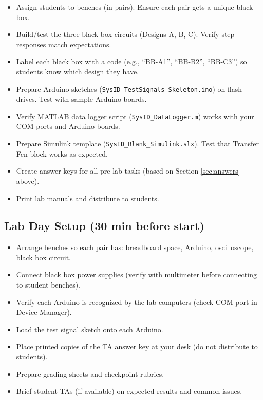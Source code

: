 \documentclass[11pt,letterpaper]{article}
\begin{document}
\begin{itemize}
    \item[$\square$] Assign students to benches (in pairs). Ensure each pair gets a unique black box.
    \item[$\square$] Build/test the three black box circuits (Designs A, B, C). Verify step responses match expectations.
    \item[$\square$] Label each black box with a code (e.g., ``BB-A1'', ``BB-B2'', ``BB-C3'') so students know which design they have.
    \item[$\square$] Prepare Arduino sketches (\texttt{SysID\_TestSignals\_Skeleton.ino}) on flash drives. Test with sample Arduino boards.
    \item[$\square$] Verify MATLAB data logger script (\texttt{SysID\_DataLogger.m}) works with your COM ports and Arduino boards.
    \item[$\square$] Prepare Simulink template (\texttt{SysID\_Blank\_Simulink.slx}). Test that Transfer Fcn block works as expected.
    \item[$\square$] Create answer keys for all pre-lab tasks (based on Section \ref{sec:answers} above).
    \item[$\square$] Print lab manuals and distribute to students.
\end{itemize}

\subsection{Lab Day Setup (30 min before start)}

\begin{itemize}
    \item[$\square$] Arrange benches so each pair has: breadboard space, Arduino, oscilloscope, black box circuit.
    \item[$\square$] Connect black box power supplies (verify with multimeter before connecting to student benches).
    \item[$\square$] Verify each Arduino is recognized by the lab computers (check COM port in Device Manager).
    \item[$\square$] Load the test signal sketch onto each Arduino.
    \item[$\square$] Place printed copies of the TA answer key at your desk (do not distribute to students).
    \item[$\square$] Prepare grading sheets and checkpoint rubrics.
    \item[$\square$] Brief student TAs (if available) on expected results and common issues.
\end{itemize}
\end{document}
